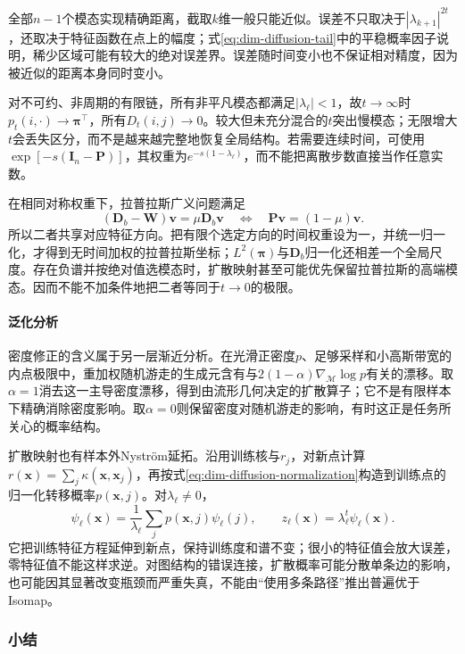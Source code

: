 全部$n-1$个模态实现精确距离，截取$k$维一般只能近似。误差不只取决于$|\lambda_{k+1}|^{2t}$，还取决于特征函数在点上的幅度；式\eqref{eq:dim-diffusion-tail}中的平稳概率因子说明，稀少区域可能有较大的绝对误差界。误差随时间变小也不保证相对精度，因为被近似的距离本身同时变小。

对不可约、非周期的有限链，所有非平凡模态都满足$|\lambda_\ell|<1$，故$t\to\infty$时$p_t(i,\cdot)\to\bm{\pi}^{\top}$，所有$D_t(i,j)\to0$。较大但未充分混合的$t$突出慢模态；无限增大$t$会丢失区分，而不是越来越完整地恢复全局结构。若需要连续时间，可使用$\exp[-s(\bm{I}_n-\bm{P})]$，其权重为$e^{-s(1-\lambda_\ell)}$，而不能把离散步数直接当作任意实数。

在相同对称权重下，拉普拉斯广义问题满足
\[
  (\bm{D}_b-\bm{W})\bm{v}=\mu\bm{D}_b\bm{v}
  \quad\Longleftrightarrow\quad
  \bm{P}\bm{v}=(1-\mu)\bm{v}.
\]
所以二者共享对应特征方向。把有限个选定方向的时间权重设为一，并统一归一化，才得到无时间加权的拉普拉斯坐标；$L^2(\bm{\pi})$与$\bm{D}_b$归一化还相差一个全局尺度。存在负谱并按绝对值选模态时，扩散映射甚至可能优先保留拉普拉斯的高端模态。因而不能不加条件地把二者等同于$t\to0$的极限。

\paragraph{泛化分析}

密度修正的含义属于另一层渐近分析。在光滑正密度$p$、足够采样和小高斯带宽的内点极限中，重加权随机游走的生成元含有与$2(1-\alpha)\nabla_{\mathcal{M}}\log p$有关的漂移。取$\alpha=1$消去这一主导密度漂移，得到由流形几何决定的扩散算子；它不是有限样本下精确消除密度影响。取$\alpha=0$则保留密度对随机游走的影响，有时这正是任务所关心的概率结构。

扩散映射也有样本外Nystr\"om延拓。沿用训练核与$r_j$，对新点计算$r(\bm{x})=\sum_j\kappa(\bm{x},\bm{x}_j)$，再按式\eqref{eq:dim-diffusion-normalization}构造到训练点的归一化转移概率$p(\bm{x},j)$。对$\lambda_\ell\ne0$，
\begin{equation}
  \label{eq:dim-diffusion-extension}
  \psi_\ell(\bm{x})
  =\frac1{\lambda_\ell}\sum_jp(\bm{x},j)\psi_\ell(j),
  \qquad
  z_\ell(\bm{x})=\lambda_\ell^t\psi_\ell(\bm{x}).
\end{equation}
它把训练特征方程延伸到新点，保持训练度和谱不变；很小的特征值会放大误差，零特征值不能这样求逆。对图结构的错误连接，扩散概率可能分散单条边的影响，也可能因其显著改变瓶颈而严重失真，不能由“使用多条路径”推出普遍优于Isomap。

\subsubsection{小结}

